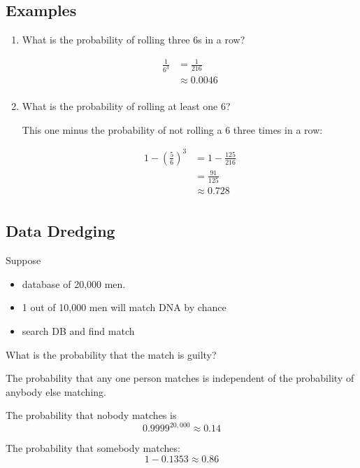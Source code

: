 \documentclass[landscape]{exam}
\begin{document}
  \subsection{Examples}
  \begin{enumerate}
    \item What is the probability of rolling three 6s in a row?
      \begin{solution}
        \begin{align*}
          \frac{1}{6^3} & = \frac{1}{216} \\
                        & \approx \boxed{ 0.0046 } \\
        \end{align*}
      \end{solution}

    \item What is the probability of rolling at least one 6?
      \begin{solution}
        This one minus the probability of not rolling a 6 three times in a row:

        \begin{align*}
          1 - \left( \frac{5}{6} \right)^3 & = 1 - \frac{125}{216} \\
                                           & = \frac{91}{125} \\
                                           & \approx \boxed{ 0.728 } \\
        \end{align*}

      \end{solution}

  \end{enumerate}

  \subsection{Data Dredging}
  Suppose 
  \begin{itemize}
    \item database of 20,000 men.
    \item 1 out of 10,000 men will match DNA by chance
    \item search DB and find match
  \end{itemize}

  What is the probability that the match is guilty?

  \begin{solution}
    The probability that any one person matches is independent of the
    probability of anybody else matching.

    The probability that nobody matches is
    \[
      0.9999^{20,000} \approx 0.14
    \]

    The probability that somebody matches:
    \[
      1 - 0.1353 \approx 0.86
    \]
  \end{solution}
\end{document}
